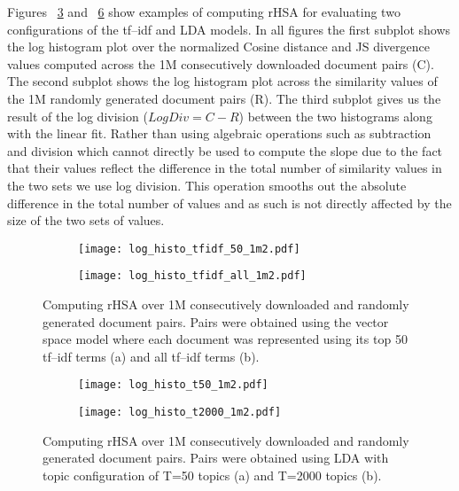 \documentclass[letterpaper]{article}
\begin{document}
Figures ~\ref{fig:logstfidf} and ~\ref{fig:logslda} show examples of computing rHSA for evaluating two configurations of the tf--idf and LDA models. In all figures the first subplot shows the log histogram plot over the normalized Cosine distance and JS divergence values computed across the 1M consecutively downloaded document pairs (C). The second subplot shows the log histogram plot across the similarity values of the 1M randomly generated document pairs (R). The third subplot gives us the result of the log division  ($LogDiv=C-R$) between the two histograms along with the linear fit. Rather than using algebraic operations such as subtraction and division which cannot directly be used to compute the slope due to the fact that their values reflect the difference in the total number of similarity values in the two sets we use log division. This operation smooths out the absolute difference in the total number of values and as such is not directly affected by the size of the two sets of values. 
\begin{figure}
\centering
\begin{subfigure}{0.72\columnwidth}
\texttt{[image: log\_histo\_tfidf\_50\_1m2.pdf]}
\caption{}
\label{fig:tfidf_suba1}
\end{subfigure}\hfill
\begin{subfigure}{0.72\columnwidth}
\texttt{[image: log\_histo\_tfidf\_all\_1m2.pdf]}
\caption{}
\label{fig:tfidf_subb1}
\end{subfigure}
\caption{Computing rHSA over 1M consecutively downloaded and randomly generated document pairs. Pairs were obtained using the vector space model where each document was represented using its top 50 tf--idf terms (a) and all tf--idf terms (b). }
\label{fig:logstfidf}
\end{figure}
\begin{figure}
 \centering
 \begin{subfigure}{0.72\columnwidth}
  \texttt{[image: log\_histo\_t50\_1m2.pdf]}
  \caption{}
  \label{fig:lda_suba2}
 \end{subfigure}\hfill
 \begin{subfigure}{0.72\columnwidth}
  \texttt{[image: log\_histo\_t2000\_1m2.pdf]}
  \caption{}
  \label{fig:lda_subb2}
  \end{subfigure}
 \caption{Computing rHSA over 1M consecutively downloaded and randomly generated document pairs. Pairs were obtained using LDA with topic configuration of T=50 topics (a) and T=2000 topics (b).}
 \label{fig:logslda}
\end{figure}
\end{document}
